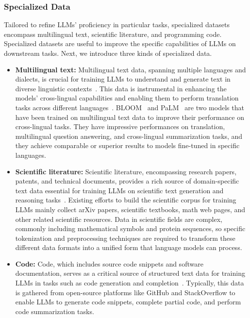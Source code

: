 \subsubsection{Specialized Data} Tailored to refine LLMs' proficiency in particular tasks, specialized datasets encompass multilingual text, scientific literature, and programming code.
Specialized datasets are useful to improve the specific capabilities of LLMs on downstream tasks.
Next, we introduce three kinds of specialized data.
\begin{itemize}
	\item \textbf{Multilingual text:} {
		      Multilingual text data, spanning multiple languages and dialects, is crucial for training LLMs to understand and generate text in diverse linguistic contexts~\cite{survey}. This data is instrumental in enhancing the models' cross-lingual capabilities and enabling them to perform translation tasks across different languages~\cite{survey}.
		      BLOOM~\cite{workshop2023bloom} and PaLM~\cite{chowdhery2022palm} are two models that have been trained on multilingual text data to improve their performance on cross-lingual tasks. They have impressive performances on translation, multilingual question answering, and cross-lingual summarization tasks, and they achieve comparable or superior results to models fine-tuned in specific languages.
	      }
	\item \textbf{Scientific literature:} {
		      Scientific literature, encompassing research papers, patents, and technical documents, provides a rich source of domain-specific text data essential for training LLMs on scientific text generation and reasoning tasks~\cite{survey, taylor2022galactica, lewkowycz2022minerva}.
		      Existing efforts to build the scientific corpus for training LLMs mainly collect arXiv papers, scientific textbooks, math web pages, and other related scientific resources.
		      Data in scientific fields are complex, commonly including mathematical symbols and protein sequences, so specific tokenization and preprocessing techniques are required to transform these different data formats into a unified form that language models can process.
	      }
	\item \textbf{Code:} {
		      Code, which includes source code snippets and software documentation, serves as a critical source of structured text data for training LLMs in tasks such as code generation and completion~\cite{survey, nijkamp2022codegen}. Typically, this data is gathered from open-source platforms like GitHub and StackOverflow to enable LLMs to generate code snippets, complete partial code, and perform code summarization tasks.
}
\end{itemize}
